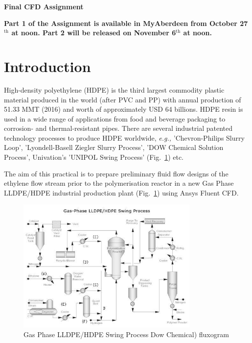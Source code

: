 \documentclass[12pts,a4paper,amsmath,amssymb,floatfix]{article}%
\newcommand{\eg}{{\it e.g., }}
\begin{document}
\begin{center}
  \Large{\bf Final CFD Assignment}
\end{center}

\begin{shaded}\begin{center}
{\bf Part 1 of the Assignment is available in MyAberdeen from October 27$^{\text{th}}$ at noon. Part 2 will be released on November 6$^{\text{th}}$ at noon.}\end{center}
\end{shaded}

\section{Introduction}
High-density polyethylene (HDPE) is the third largest commodity plastic material produced in the world (after PVC and PP) with annual production of 51.33 MMT (2016) and worth of approximately USD 64 billions. HDPE resin is used in a wide range of applications from food and beverage packaging to corrosion- and thermal-resistant pipes. There are several industrial patented technology processes to produce HDPE worldwide, \eg 'Chevron-Philips Slurry Loop', 'Lyondell-Basell Ziegler Slurry Process', 'DOW Chemical Solution Process', Univation's 'UNIPOL Swing Process' (Fig.~\ref{HDPE_Plant}) etc.

\medskip
The aim of this practical is to prepare preliminary fluid flow designs of the ethylene flow stream prior to the polymerisation reactor in a new Gas Phase LLDPE/HDPE industrial production plant (Fig.~\ref{HDPE_Plant}) using Ansys Fluent CFD.

\begin{figure}[H]
  \begin{center}
     \includegraphics[width=0.8\textwidth,clip]{./Pics/hdpe_production_img2.jpg}
     \caption{Gas Phase LLDPE/HDPE Swing Process Dow Chemical) fluxogram}\label{HDPE_Plant}
  \end{center}
\end{figure}
\end{document}
